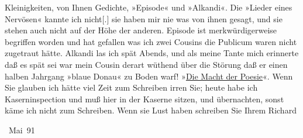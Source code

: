                Kleinigkeiten, von Ihnen Gedichte, »Episode« und
                  »Alkandi«. Die »Lieder eines Nervösen« kannte ich nicht{[}.{]} sie
               haben mir nie was von ihnen gesagt, und sie stehen auch nicht auf der Höhe der
               anderen. Episode ist merkwürdigerweise begriffen
               worden und hat gefallen {\pb}was ich
               zwei Cousins die
               Publicum waren nicht zugetraut hätte. Alkandi
               las ich spät Abends, und als meine Tante mich erinnerte daß es spät sei war mein Cousin
               derart wüthend über die Störung daß er einen halben Jahrgang »blaue Donau« zu Boden warf! »\uline{Die Macht
                  der Poesie}«. Wenn Sie glauben ich hätte viel Zeit zum Schreiben irren Sie;
               heute habe ich Kaserninspection und muß hier in der Kaserne sitzen, und übernachten,
               sonst käme ich nicht zum Schreiben. Wenn sie Lust haben schreiben Sie
               Ihrem \spacefill\mbox{Richard}\pend
           
 Mai 91\pend
           
